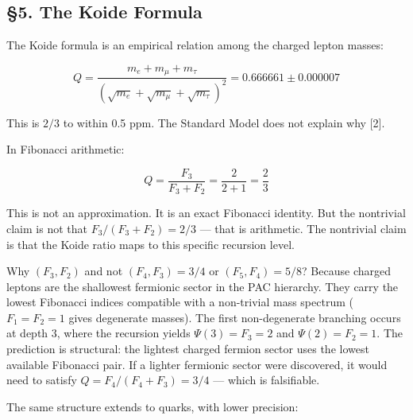 \documentclass[
  11pt,
  a4paper]{article}
\begin{document}
\subsection{§5. The Koide Formula}\label{the-koide-formula}

The Koide formula is an empirical relation among the charged lepton
masses:

\[Q = \frac{m_e + m_\mu + m_\tau}{(\sqrt{m_e} + \sqrt{m_\mu} + \sqrt{m_\tau})^2} = 0.666661 \pm 0.000007\]

This is \(2/3\) to within 0.5 ppm. The Standard Model does not explain
why {[}2{]}.

In Fibonacci arithmetic:

\[Q = \frac{F_3}{F_3 + F_2} = \frac{2}{2 + 1} = \frac{2}{3}\]

This is not an approximation. It is an exact Fibonacci identity. But the
nontrivial claim is not that \(F_3/(F_3 + F_2) = 2/3\) --- that is
arithmetic. The nontrivial claim is that the Koide ratio maps to this
specific recursion level.

Why \((F_3, F_2)\) and not \((F_4, F_3) = 3/4\) or \((F_5, F_4) = 5/8\)?
Because charged leptons are the shallowest fermionic sector in the PAC
hierarchy. They carry the lowest Fibonacci indices compatible with a
non-trivial mass spectrum (\(F_1 = F_2 = 1\) gives degenerate masses).
The first non-degenerate branching occurs at depth 3, where the
recursion yields \(\Psi(3) = F_3 = 2\) and \(\Psi(2) = F_2 = 1\). The
prediction is structural: the lightest charged fermion sector uses the
lowest available Fibonacci pair. If a lighter fermionic sector were
discovered, it would need to satisfy \(Q = F_4/(F_4 + F_3) = 3/4\) ---
which is falsifiable.

The same structure extends to quarks, with lower precision:
\end{document}
